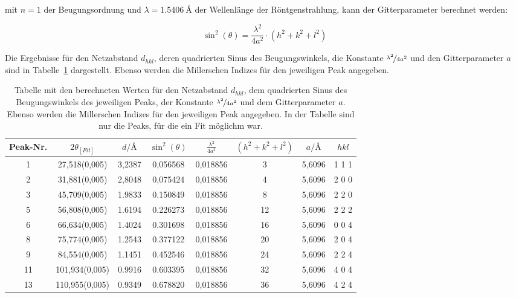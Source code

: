 mit $n = 1$ der Beugungsordnung und $\lambda = \SI{1,5406}{\angstrom}$ der Wellenlänge der Röntgenstrahlung, kann der Gitterparameter berechnet werden:

\begin{equation}
    \sin^2(\theta) = \frac{\lambda^2}{4a^2} \cdot (h^2 + k^2 + l^2)
\end{equation}

Die Ergebnisse für den Netzabstand $d_{hkl}$, deren quadrierten Sinus des Beugungswinkels, die Konstante $\nicefrac[]{\lambda^2}{4a^2}$ und den Gitterparameter $a$ sind in Tabelle~\ref{tab:gitter} dargestellt. Ebenso werden die Millerschen Indizes für den jeweiligen Peak angegeben.

\begin{table}[h!]
    \centering
     \begin{tabular}{|c|c|c|c|c|c|c|c|} 
     \hline
     Peak-Nr. & $2\theta_{[Fit]}$ & $d/\si{\angstrom}$ & $\sin^2(\theta)$ & $\frac{\lambda^2}{4a^2}$ & $(h^2+k^2+l^2)$ & $a/\si{\angstrom}$ &  $h k l $ \\ [0.5ex] 
     \hline\hline
     1 & \num{27,518(0,005)} & 3,2387 & 0,056568 & 0,018856 & 3 & 5,6096 & 1 1 1 \\
     2 & \num{31,881(0,005)} & 2,8048 & 0,075424 & 0,018856 & 4 & 5,6096 & 2 0 0 \\
     3 & \num{45,709(0,005)} & 1.9833 & 0.150849 & 0,018856 & 8 & 5,6096 & 2 2 0 \\
     5 & \num{56,808(0,005)} & 1.6194 & 0.226273 & 0,018856 & 12 & 5,6096 & 2 2 2 \\ 
     6 & \num{66,634(0,005)} & 1.4024 & 0.301698 & 0,018856 & 16 &  5,6096 & 0 0 4\\
     8 & \num{75,774(0,005)} & 1.2543 & 0.377122 & 0,018856 & 20 &  5,6096 & 2 0 4\\
     9 & \num{84,554(0,005)} & 1.1451  &  0.452546 & 0,018856 & 24 &  5,6096 & 2 2 4\\
     11 & \num{101,934(0,005)} & 0.9916 & 0.603395 & 0,018856 & 32 &  5,6096 & 4 0 4\\
     13 & \num{110,955(0,005)} & 0.9349 & 0.678820 & 0,018856 & 36 &  5,6096 & 4 2 4\\ [1ex] 
     \hline
     \end{tabular}
     \caption[short]{Tabelle mit den berechneten Werten für den Netzabstand $d_{hkl}$, dem quadrierten Sinus des Beugungswinkels des jeweiligen Peaks, der Konstante $\nicefrac[]{\lambda^2}{4a^2}$ und dem Gitterparameter $a$. Ebenso werden die Millerschen Indizes für den jeweiligen Peak angegeben. In der Tabelle sind nur die Peaks, für die ein Fit möglichm war.}
     \label{tab:gitter}
\end{table}

